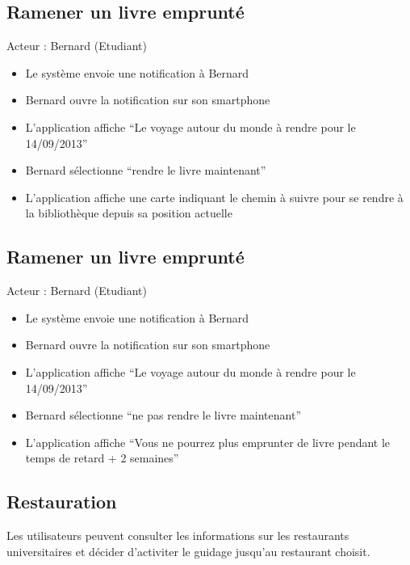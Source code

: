 \subsection*{Ramener un livre emprunté}
Acteur : Bernard (Etudiant)
\begin{itemize}
\item Le système envoie une notification à Bernard 
\item Bernard ouvre la notification sur son smartphone 
\item L’application affiche “Le voyage autour du monde à rendre pour le 14/09/2013” 
\item Bernard sélectionne “rendre le livre maintenant” 
\item L’application affiche une carte indiquant le chemin à suivre pour se rendre à la bibliothèque depuis sa position actuelle 
\end{itemize}

\subsection*{Ramener un livre emprunté}
Acteur : Bernard (Etudiant)
\begin{itemize}
\item Le système envoie une notification à Bernard 
\item Bernard ouvre la notification sur son smartphone 
\item L’application affiche “Le voyage autour du monde à rendre pour le 14/09/2013” 
\item Bernard sélectionne “ne pas rendre le livre maintenant” 
\item L’application affiche “Vous ne pourrez plus emprunter de livre pendant le temps de retard + 2 semaines” 
\end{itemize}

\newpage

\subsection{Restauration}

Les utilisateurs peuvent consulter les informations sur les restaurants universitaires et décider d'activiter le guidage jusqu'au restaurant choisit.

